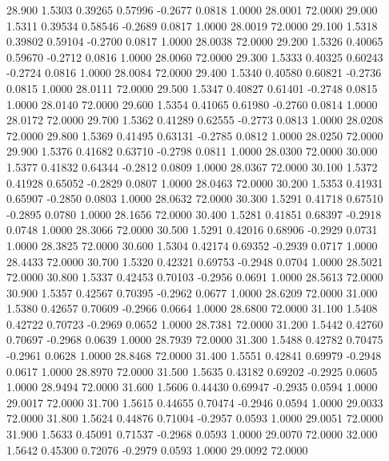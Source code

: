  28.900   1.5303   0.39265   0.57996  -0.2677   0.0818   1.0000  28.0001  72.0000
  29.000   1.5311   0.39534   0.58546  -0.2689   0.0817   1.0000  28.0019  72.0000
  29.100   1.5318   0.39802   0.59104  -0.2700   0.0817   1.0000  28.0038  72.0000
  29.200   1.5326   0.40065   0.59670  -0.2712   0.0816   1.0000  28.0060  72.0000
  29.300   1.5333   0.40325   0.60243  -0.2724   0.0816   1.0000  28.0084  72.0000
  29.400   1.5340   0.40580   0.60821  -0.2736   0.0815   1.0000  28.0111  72.0000
  29.500   1.5347   0.40827   0.61401  -0.2748   0.0815   1.0000  28.0140  72.0000
  29.600   1.5354   0.41065   0.61980  -0.2760   0.0814   1.0000  28.0172  72.0000
  29.700   1.5362   0.41289   0.62555  -0.2773   0.0813   1.0000  28.0208  72.0000
  29.800   1.5369   0.41495   0.63131  -0.2785   0.0812   1.0000  28.0250  72.0000
  29.900   1.5376   0.41682   0.63710  -0.2798   0.0811   1.0000  28.0300  72.0000
  30.000   1.5377   0.41832   0.64344  -0.2812   0.0809   1.0000  28.0367  72.0000
  30.100   1.5372   0.41928   0.65052  -0.2829   0.0807   1.0000  28.0463  72.0000
  30.200   1.5353   0.41931   0.65907  -0.2850   0.0803   1.0000  28.0632  72.0000
  30.300   1.5291   0.41718   0.67510  -0.2895   0.0780   1.0000  28.1656  72.0000
  30.400   1.5281   0.41851   0.68397  -0.2918   0.0748   1.0000  28.3066  72.0000
  30.500   1.5291   0.42016   0.68906  -0.2929   0.0731   1.0000  28.3825  72.0000
  30.600   1.5304   0.42174   0.69352  -0.2939   0.0717   1.0000  28.4433  72.0000
  30.700   1.5320   0.42321   0.69753  -0.2948   0.0704   1.0000  28.5021  72.0000
  30.800   1.5337   0.42453   0.70103  -0.2956   0.0691   1.0000  28.5613  72.0000
  30.900   1.5357   0.42567   0.70395  -0.2962   0.0677   1.0000  28.6209  72.0000
  31.000   1.5380   0.42657   0.70609  -0.2966   0.0664   1.0000  28.6800  72.0000
  31.100   1.5408   0.42722   0.70723  -0.2969   0.0652   1.0000  28.7381  72.0000
  31.200   1.5442   0.42760   0.70697  -0.2968   0.0639   1.0000  28.7939  72.0000
  31.300   1.5488   0.42782   0.70475  -0.2961   0.0628   1.0000  28.8468  72.0000
  31.400   1.5551   0.42841   0.69979  -0.2948   0.0617   1.0000  28.8970  72.0000
  31.500   1.5635   0.43182   0.69202  -0.2925   0.0605   1.0000  28.9494  72.0000
  31.600   1.5606   0.44430   0.69947  -0.2935   0.0594   1.0000  29.0017  72.0000
  31.700   1.5615   0.44655   0.70474  -0.2946   0.0594   1.0000  29.0033  72.0000
  31.800   1.5624   0.44876   0.71004  -0.2957   0.0593   1.0000  29.0051  72.0000
  31.900   1.5633   0.45091   0.71537  -0.2968   0.0593   1.0000  29.0070  72.0000
  32.000   1.5642   0.45300   0.72076  -0.2979   0.0593   1.0000  29.0092  72.0000
